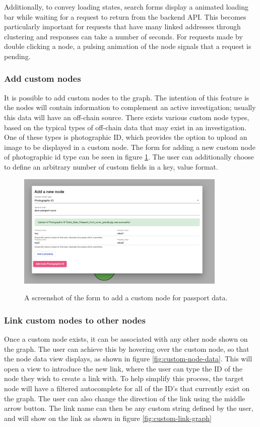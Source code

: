 Additionally, to convey loading states, search forms display a animated loading bar while waiting for a request to return from the backend API. This becomes particularly important for requests that have many linked addresses through clustering and responses can take a number of seconds. For requests made by double clicking a node, a pulsing animation of the node signals that a request is pending.

\subsubsection{Add custom nodes}
It is possible to add custom nodes to the graph. The intention of this feature is the nodes will contain information to complement an active investigation; usually this data will have an off-chain source. There exists various custom node types, based on the typical types of off-chain data that may exist in an investigation. One of these types is photographic ID, which provides the option to upload an image to be displayed in a custom node. The form for adding a new custom node of photographic id type can be seen in figure \ref{fig:add-passport-form}. The user can additionally choose to define an arbitrary number of custom fields in a key, value format. 


\begin{figure}[h!]
  \centering
  \includegraphics[width = 10cm]{./figures/ui-screenshots/add-passport-form-success}\\[0.5cm] 
  \caption{A screenshot of the form to add a custom node for passport data.}
  \label{fig:add-passport-form}
\end{figure}


\subsubsection{Link custom nodes to other nodes}
Once a custom node exists, it can be associated with any other node shown on the graph. The user can achieve this by hovering over the custom node, so that the node data view displays, as shown in figure \ref{fig:custom-node-data}. This will open a view to introduce the new link, where the user can type the ID of the node they wish to create a link with. To help simplify this process, the target node will have a filtered autocomplete for all of the ID's that currently exist on the graph. The user can also change the direction of the link using the middle arrow button. The link name can then be any custom string defined by the user, and will show on the link as shown in figure \ref{fig:custom-link-graph}

